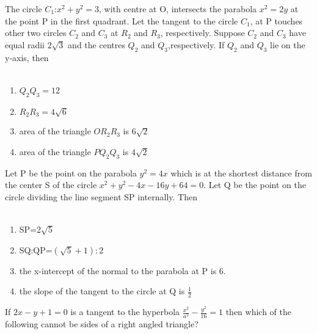 \documentclass[journal,12pt,twocolumn]{IEEEtran}
\theoremstyle{remark}
\begin{document}
      \item The circle $C_1$:$x^2+y^2=3$, with centre at O, intersects the parabola $x^2=2y$ at the point P in the first quadrant. Let the tangent to the circle $C_1$, at P touches other two circles $C_2$ and $C_3$ at $R_2$ and $R_3$, respectively. Suppose $C_2$ and $C_3$ have equal radii $2\sqrt{3}$ and the centres $Q_2$ and $Q_3$,respectively. If $Q_2$ and $Q_3$ lie on the y-axis, then \\ 
	      \hfill{}
	      \\
	      \begin{enumerate}
		      \item $Q_2Q_3=12$
		      \item $R_2R_3=4\sqrt{6}$
		      \item area of the triangle $OR_2R_3$ is $6\sqrt{2}$
		      \item area of the triangle $PQ_2Q_3$ is $4\sqrt{2}$
	      \end{enumerate}
      \item Let P be the point on the parabola $y^2=4x$ which is at the shortest distance from the center S of the circle $x^2+y^2-4x-16y+64=0$. Let Q be the point on the circle
	      dividing the line segment SP internally. Then \\
	      \hfill{}
	      \\
	      \begin{enumerate}
		      \item SP=2$\sqrt{5}$
		      \item SQ:QP=$(\sqrt{5}+1):2$
		      \item the x-intercept of the normal to the parabola at P is 6.
		      \item the slope of the tangent to the circle at Q is $\frac{1}{2}$
		      
	      \end{enumerate}
      \item If $2x-y+1=0$ is a tangent to the hyperbola $\frac{x^2}{a^2}-\frac{y^2}{16}=1$ then which of the following cannot be sides of a right angled triangle? \\
	      \hfill{}
\end{document}
